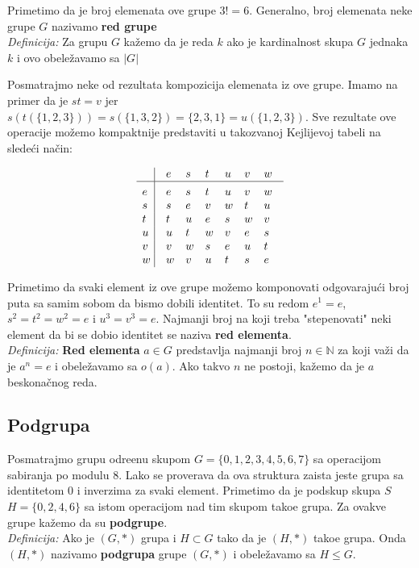 \documentclass{article}
\begin{document}
Primetimo da je broj elemenata ove grupe $3! = 6$. Generalno, broj elemenata neke grupe $G$ nazivamo \textbf{red grupe} \\

\textit{Definicija:} Za grupu $G$ kažemo da je reda $k$ ako je kardinalnost skupa $G$ jednaka $k$ i ovo obeležavamo sa $|G|$

Posmatrajmo neke od rezultata kompozicija elemenata iz ove grupe. Imamo na primer da je $st=v$ jer $s(t(\{1, 2, 3\})) = s(\{1, 3, 2\}) = \{2, 3, 1\} = u(\{1, 2, 3\})$. Sve rezultate ove operacije možemo kompaktnije predstaviti u takozvanoj Kejlijevoj tabeli na sledeći način:

$$\vbox{\tabskip0.5em\offinterlineskip
    \halign{\strut$#$\hfil\ \tabskip1em\vrule&&$#$\hfil\cr
    ~   & e   & s   & t & u   & v   & w   \cr
    \noalign{\hrule}\vrule height 12pt width 0pt
    e   & e   & s   & t   & u   & v   & w   \cr
    s   & s   & e   & v   & w   & t   & u   \cr
    t   & t   & u   & e   & s   & w   & v   \cr
    u   & u   & t   & w   & v   & e   & s   \cr
    v   & v   & w   & s   & e   & u   & t   \cr
    w   & w   & v   & u   & t   & s   & e   \cr
}}$$

Primetimo da svaki element iz ove grupe možemo komponovati odgovarajući broj puta sa samim sobom da bismo dobili identitet. To su redom $e^1 = e$, $s^2 = t^2 = w^2 = e$ i $u^3 = v^3 = e$. Najmanji broj na koji treba "stepenovati" neki element da bi se dobio identitet se naziva \textbf{red elementa}. \\

\textit{Definicija:} \textbf{Red elementa} $a \in G$ predstavlja najmanji broj $n \in \mathbb{N}$ za koji važi da je $a^n = e$ i obeležavamo sa $o(a)$. Ako takvo $n$ ne postoji, kažemo da je $a$ beskonačnog reda. 

\subsection{Podgrupa}

Posmatrajmo grupu odre\dj enu skupom $ G = \{0, 1, 2, 3, 4, 5, 6, 7\}$ sa operacijom sabiranja po modulu $8$. Lako se proverava da ova struktura zaista jeste grupa sa identitetom $0$ i inverzima za svaki element. Primetimo da je podskup skupa $S$ $H = \{0, 2, 4, 6\}$ sa istom operacijom nad tim skupom tako\dj e grupa. Za ovakve grupe kažemo da su \textbf{podgrupe}. \\

\textit{Definicija:} Ako je $(G, *)$ grupa i $H \subset G$ tako da je $(H, *)$ tako\dj e grupa. Onda $(H, *)$ nazivamo \textbf{podgrupa} grupe $(G, *)$ i obeležavamo sa $H \leq G$.\\
\end{document}
